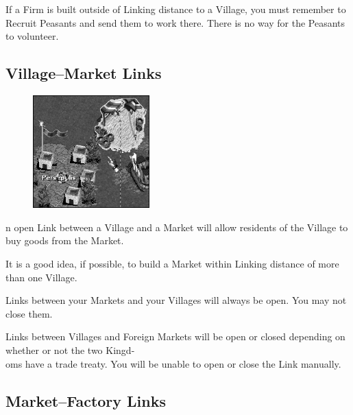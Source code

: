 If a Firm is built outside of Linking distance to a Village, you must remember to Recruit Peasants and send them to work there. There is no way for the Peasants to volunteer.

\subsection{Village–Market Links}


\begin{figure}
	\vspace{-20pt}
	\begin{center}
		\includegraphics[width=0.4\textwidth]{Ilink_villagemarket}
	\end{center}
	\vspace{-20pt}
\end{figure}

n open Link between a Village and a Market will allow residents of the Village to buy goods from the Market.

It is a good idea, if possible, to build a Market within Linking distance of more than one Village.

Links between your Markets and your Villages will always be open. You may not close them.

Links between Villages and Foreign Markets will be open or closed depending on whether or not the two Kingd-\\
oms have a trade treaty. You will be unable to open or close the Link manually.

\subsection{Market–Factory Links}


